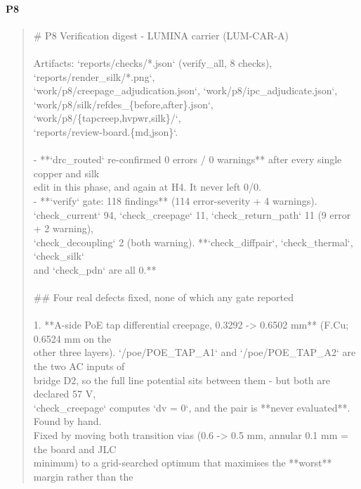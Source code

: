 \documentclass[11pt,a4paper]{article}
\begin{document}
\paragraph*{P8}
\begin{quote}\small\ttfamily\raggedright
\# P8 Verification digest - LUMINA carrier (LUM-CAR-A)\\
~\\
Artifacts: `reports/checks/{*}.json` (verify\_all, 8 checks), `reports/render\_silk/{*}.png`,\\
`work/p8/creepage\_adjudication.json`, `work/p8/ipc\_adjudicate.json`,\\
`work/p8/silk/refdes\_\{before,after\}.json`, `work/p8/\{tapcreep,hvpwr,silk\}/`,\\
`reports/review-board.\{md,json\}`.\\
~\\
- {*}{*}`drc\_routed` re-confirmed 0 errors / 0 warnings{*}{*} after every single copper and silk\\
  edit in this phase, and again at H4. It never left 0/0.\\
- {*}{*}`verify` gate: 118 findings{*}{*} (114 error-severity + 4 warnings).\\
  `check\_current` 94, `check\_creepage` 11, `check\_return\_path` 11 (9 error + 2 warning),\\
  `check\_decoupling` 2 (both warning). {*}{*}`check\_diffpair`, `check\_thermal`, `check\_silk`\\
  and `check\_pdn` are all 0.{*}{*}\\
~\\
\#\# Four real defects fixed, none of which any gate reported\\
~\\
1. {*}{*}A-side PoE tap differential creepage, 0.3292 -\textgreater{} 0.6502 mm{*}{*} (F.Cu; 0.6524 mm on the\\
   other three layers). `/poe/POE\_TAP\_A1` and `/poe/POE\_TAP\_A2` are the two AC inputs of\\
   bridge D2, so the full line potential sits between them - but both are declared 57 V,\\
   `check\_creepage` computes `dv = 0`, and the pair is {*}{*}never evaluated{*}{*}. Found by hand.\\
   Fixed by moving both transition vias (0.6 -\textgreater{} 0.5 mm, annular 0.1 mm = the board and JLC\\
   minimum) to a grid-searched optimum that maximises the {*}{*}worst{*}{*} margin rather than the\\

\end{quote}
\end{document}

